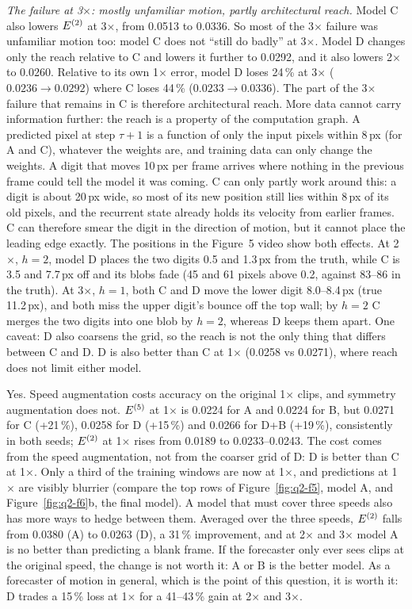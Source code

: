 \emph{The failure at 3$\times$: mostly unfamiliar motion, partly architectural reach.} Model C also lowers
$E^{(2)}$ at 3$\times$, from 0.0513 to 0.0336. So most of the 3$\times$ failure was unfamiliar motion too:
model C does not ``still do badly'' at 3$\times$. Model D changes only the reach relative to C and lowers
it further to 0.0292, and it also lowers 2$\times$ to 0.0260. Relative to its own 1$\times$ error, model D
loses 24\,\% at 3$\times$ ($0.0236\to0.0292$) where C loses 44\,\% ($0.0233\to0.0336$). The part of the
3$\times$ failure that remains in C is therefore architectural reach. More data cannot carry information
further: the reach is a property of the computation graph. A predicted pixel at step $\tau+1$ is a
function of only the input pixels within 8\,px (for A and C), whatever the weights are, and training data
can only change the weights. A digit that moves 10\,px per frame arrives where nothing in the previous frame
could tell the model it was coming. C can only partly work around this: a digit is about 20\,px wide, so
most of its new position still lies within 8\,px of its old pixels, and the recurrent state already
holds its velocity from earlier frames. C can therefore smear the digit in the direction of motion, but it
cannot place the leading edge exactly. The positions in the Figure~5 video show both effects. At 2$\times$,
$h=2$, model D places the two digits 0.5 and 1.3\,px from the truth, while C is 3.5 and 7.7\,px off and
its blobs fade (45 and 61 pixels above 0.2, against 83--86 in the truth). At 3$\times$, $h=1$, both C and D move the lower digit 8.0--8.4\,px (true 11.2\,px), and both miss the
upper digit's bounce off the top wall; by $h=2$ C merges the two digits into one blob by $h=2$, whereas D keeps them apart.
One caveat: D also coarsens the grid, so the reach is not the only thing that differs between C and D.
D is also better than C at 1$\times$ (0.0258 vs 0.0271), where reach does not limit either model.

 Yes. Speed augmentation costs accuracy on the original 1$\times$ clips, and symmetry
augmentation does not. $E^{(5)}$ at 1$\times$ is 0.0224 for A and 0.0224 for B, but 0.0271 for C
(+21\,\%), 0.0258 for D (+15\,\%) and 0.0266 for D+B (+19\,\%), consistently in both seeds; $E^{(2)}$ at
1$\times$ rises from 0.0189 to 0.0233--0.0243. The cost comes from the speed augmentation, not from the
coarser grid of D: D is better than C at 1$\times$. Only a third of the training windows are now at 1$\times$,
and predictions at 1$\times$ are visibly blurrier (compare the top rows of Figure~\ref{fig:q2-f5}, model A, and
Figure~\ref{fig:q2-f6}b, the final model). A model that must cover
three speeds also has more ways to hedge between them. Averaged over the three speeds, $E^{(2)}$ falls from
0.0380 (A) to 0.0263 (D), a 31\,\% improvement, and at 2$\times$ and 3$\times$ model A is no better than
predicting a blank frame. If the forecaster only ever sees clips at the original speed, the change is not
worth it: A or B is the better model. As a forecaster of motion in general, which is the point of this
question, it is worth it: D trades a 15\,\% loss at 1$\times$ for a 41--43\,\% gain at 2$\times$ and
3$\times$.

